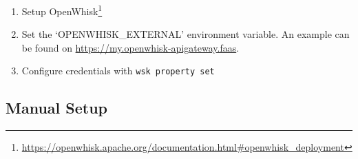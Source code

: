 \documentclass[../main.tex]{subfiles}
\begin{document}
\begin{enumerate}
  \item Setup OpenWhisk\footnote{\url{https://openwhisk.apache.org/documentation.html\#openwhisk\_deployment}}
\item Set the `OPENWHISK\_EXTERNAL' environment variable. An example can be found on \url{https://my.openwhisk-apigateway.faas}.
\item Configure credentials with \texttt{wsk property set}
\end{enumerate}

\subsection{Manual Setup}\label{sec:manualsetup}
\end{document}
